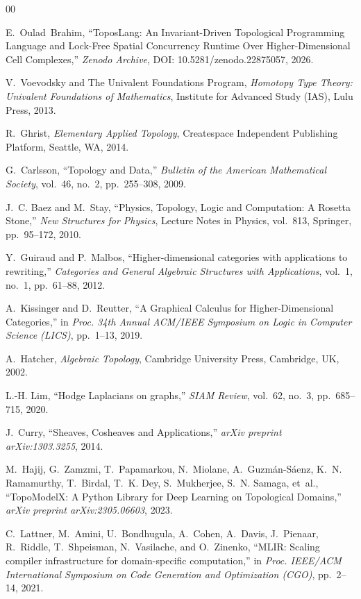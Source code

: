\documentclass[conference]{IEEEtran}
\begin{document}
\begin{thebibliography}{00}

E.~Oulad~Brahim,
``ToposLang: An Invariant-Driven Topological Programming Language and Lock-Free Spatial Concurrency Runtime Over Higher-Dimensional Cell Complexes,''
\emph{Zenodo Archive}, DOI: 10.5281/zenodo.22875057, 2026.

V.~Voevodsky and {The Univalent Foundations Program},
\emph{Homotopy Type Theory: Univalent Foundations of Mathematics},
Institute for Advanced Study (IAS), Lulu Press, 2013.

R.~Ghrist,
\emph{Elementary Applied Topology},
Createspace Independent Publishing Platform, Seattle, WA, 2014.

G.~Carlsson,
``Topology and Data,''
\emph{Bulletin of the American Mathematical Society}, vol.~46, no.~2, pp.~255--308, 2009.

J.~C. Baez and M.~Stay,
``Physics, Topology, Logic and Computation: A Rosetta Stone,''
\emph{New Structures for Physics}, Lecture Notes in Physics, vol.~813, Springer, pp.~95--172, 2010.

Y.~Guiraud and P.~Malbos,
``Higher-dimensional categories with applications to rewriting,''
\emph{Categories and General Algebraic Structures with Applications}, vol.~1, no.~1, pp.~61--88, 2012.

A.~Kissinger and D.~Reutter,
``A Graphical Calculus for Higher-Dimensional Categories,''
in \emph{Proc. 34th Annual ACM/IEEE Symposium on Logic in Computer Science (LICS)}, pp.~1--13, 2019.

A.~Hatcher,
\emph{Algebraic Topology},
Cambridge University Press, Cambridge, UK, 2002.

L.-H. Lim,
``Hodge Laplacians on graphs,''
\emph{SIAM Review}, vol.~62, no.~3, pp.~685--715, 2020.

J.~Curry,
``Sheaves, Cosheaves and Applications,''
\emph{arXiv preprint arXiv:1303.3255}, 2014.

M.~Hajij, G.~Zamzmi, T.~Papamarkou, N.~Miolane, A.~Guzm{\'a}n-S{\'a}enz, K.~N. Ramamurthy, T.~Birdal, T.~K. Dey, S.~Mukherjee, S.~N. Samaga, et~al.,
``TopoModelX: A Python Library for Deep Learning on Topological Domains,''
\emph{arXiv preprint arXiv:2305.06603}, 2023.

C.~Lattner, M.~Amini, U.~Bondhugula, A.~Cohen, A.~Davis, J.~Pienaar, R.~Riddle, T.~Shpeisman, N.~Vasilache, and O.~Zinenko,
``MLIR: Scaling compiler infrastructure for domain-specific computation,''
in \emph{Proc. IEEE/ACM International Symposium on Code Generation and Optimization (CGO)}, pp.~2--14, 2021.

\end{thebibliography}
\end{document}
